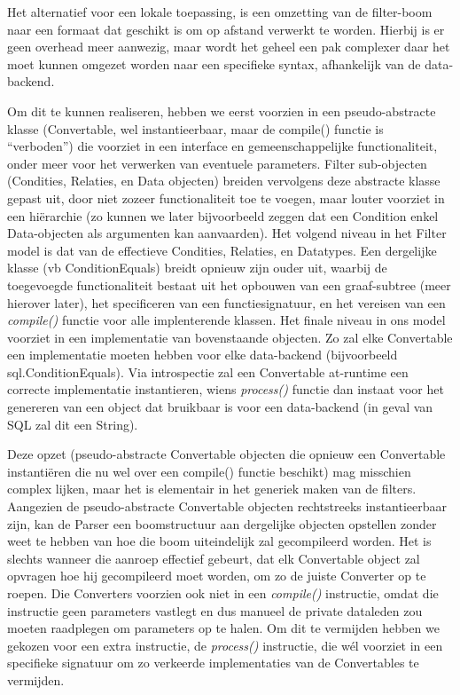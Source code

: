 Het alternatief voor een lokale toepassing, is een omzetting van de filter-boom naar een formaat dat geschikt is om op afstand verwerkt te worden. Hierbij is er geen overhead meer aanwezig, maar wordt het geheel een pak complexer daar het moet kunnen omgezet worden naar een specifieke syntax, afhankelijk van de data-backend.

Om dit te kunnen realiseren, hebben we eerst voorzien in een pseudo-abstracte klasse (Convertable, wel instantieerbaar, maar de compile() functie is ``verboden'') die voorziet in een interface en gemeenschappelijke functionaliteit, onder meer voor het verwerken van eventuele parameters. Filter sub-objecten (Condities, Relaties, en Data objecten) breiden vervolgens deze abstracte klasse gepast uit, door niet zozeer functionaliteit toe te voegen, maar louter voorziet in een hi\"erarchie (zo kunnen we later bijvoorbeeld zeggen dat een Condition enkel Data-objecten als argumenten kan aanvaarden).
Het volgend niveau in het Filter model is dat van de effectieve Condities, Relaties, en Datatypes. Een dergelijke klasse (vb ConditionEquals) breidt opnieuw zijn ouder uit, waarbij de toegevoegde functionaliteit bestaat uit het opbouwen van een graaf-subtree (meer hierover later), het specificeren van een functiesignatuur, en het vereisen van een \emph{compile()} functie voor alle implenterende klassen.
Het finale niveau in ons model voorziet in een implementatie van bovenstaande objecten. Zo zal elke Convertable een implementatie moeten hebben voor elke data-backend (bijvoorbeeld sql.ConditionEquals). Via introspectie zal een Convertable at-runtime een correcte implementatie instantieren, wiens \emph{process()} functie dan instaat voor het genereren van een object dat bruikbaar is voor een data-backend (in geval van SQL zal dit een String).

Deze opzet (pseudo-abstracte Convertable objecten die opnieuw een Convertable instanti\"eren die nu wel over een compile() functie beschikt) mag misschien complex lijken, maar het is elementair in het generiek maken van de filters. Aangezien de pseudo-abstracte Convertable objecten rechtstreeks instantieerbaar zijn, kan de Parser een boomstructuur aan dergelijke objecten opstellen zonder weet te hebben van hoe die boom uiteindelijk zal gecompileerd worden. Het is slechts wanneer die aanroep effectief gebeurt, dat elk Convertable object zal opvragen hoe hij gecompileerd moet worden, om zo de juiste Converter op te roepen. Die Converters voorzien ook niet in een \emph{compile()} instructie, omdat die instructie geen parameters vastlegt en dus manueel de private dataleden zou moeten raadplegen om parameters op te halen. Om dit te vermijden hebben we gekozen voor een extra instructie, de \emph{process()} instructie, die w\'el voorziet in een specifieke signatuur om zo verkeerde implementaties van de Convertables te vermijden.

